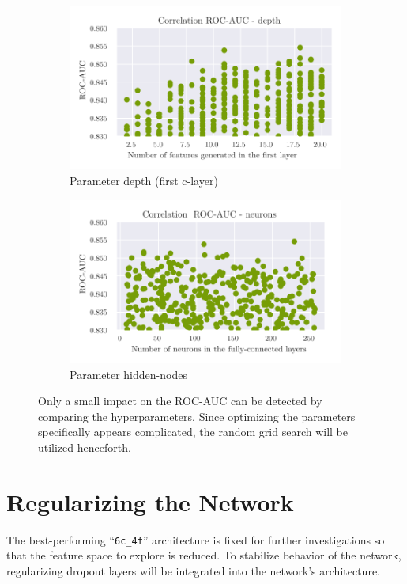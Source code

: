 \begin{figure}
\centering
\begin{subfigure}{.5\textwidth}
  \centering
  \includegraphics[scale=0.55]{Plots/Best_Hyperparameter_Depth_1.pdf}
  \caption{Parameter depth (first c-layer)}
  \label{fig:depth}
\end{subfigure}%
\begin{subfigure}{.5\textwidth}
  \centering
  \includegraphics[scale=0.55]{Plots/Best_Hyperparameter_Hidden_Nodes.pdf}
  \caption{Parameter hidden-nodes}
  \label{fig:hidden_nodes}
\end{subfigure}
\caption{Only a small impact on the ROC-AUC can be detected by comparing the hyperparameters. Since optimizing the parameters specifically appears complicated, the random grid search will be utilized henceforth.}
\label{fig:parameter}
\end{figure}



\section{Regularizing the Network}
The best-performing \enquote{\texttt{6c\_4f}} architecture is fixed for further investigations
so that the feature space to explore is reduced.
To stabilize behavior of the network, regularizing dropout layers will be integrated into the network's architecture.


